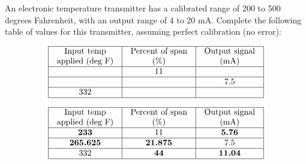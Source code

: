 

An electronic temperature transmitter has a calibrated range of 200 to 500 degrees Fahrenheit, with an output range of 4 to 20 mA.  Complete the following table of values for this transmitter, assuming perfect calibration (no error):


$$\vbox{\offinterlineskip
\halign{\strut
\vrule \quad\hfil # \ \hfil & 
\vrule \quad\hfil # \ \hfil & 
\vrule \quad\hfil # \ \hfil \vrule \cr
\noalign{\hrule}
%
Input temp & Percent of span & Output signal \cr
%
applied (deg F) & (\%) & (mA) \cr
%
\noalign{\hrule}
%
 & 11 &  \cr
%
\noalign{\hrule}
%
 &  & 7.5 \cr
%
\noalign{\hrule}
%
332 &  &  \cr
%
\noalign{\hrule}
} %
}$$ %









$$\vbox{\offinterlineskip
\halign{\strut
\vrule \quad\hfil # \ \hfil & 
\vrule \quad\hfil # \ \hfil & 
\vrule \quad\hfil # \ \hfil \vrule \cr
\noalign{\hrule}
%
Input temp & Percent of span & Output signal \cr
%
applied (deg F) & (\%) & (mA) \cr
%
\noalign{\hrule}
%
{\bf 233} & 11 & {\bf 5.76} \cr
%
\noalign{\hrule}
%
{\bf 265.625} & {\bf 21.875} & 7.5 \cr
%
\noalign{\hrule}
%
332 & {\bf 44} & {\bf 11.04} \cr
%
\noalign{\hrule}
} %
}$$ %









